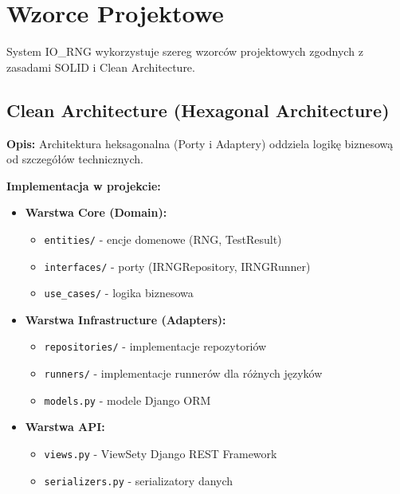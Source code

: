 \documentclass[12pt,a4paper]{article}
\begin{document}
\newpage

\section{Wzorce Projektowe}

System IO\_RNG wykorzystuje szereg wzorców projektowych zgodnych z zasadami SOLID i Clean Architecture.

\subsection{Clean Architecture (Hexagonal Architecture)}

\textbf{Opis:} Architektura heksagonalna (Porty i Adaptery) oddziela logikę biznesową od szczegółów technicznych.

\textbf{Implementacja w projekcie:}

\begin{tcolorbox}[colback=blue!5!white,colframe=blue!75!black,title=Struktura Clean Architecture]
\begin{itemize}
    \item \textbf{Warstwa Core (Domain):}
    \begin{itemize}
        \item \texttt{entities/} - encje domenowe (RNG, TestResult)
        \item \texttt{interfaces/} - porty (IRNGRepository, IRNGRunner)
        \item \texttt{use\_cases/} - logika biznesowa
    \end{itemize}
    
    \item \textbf{Warstwa Infrastructure (Adapters):}
    \begin{itemize}
        \item \texttt{repositories/} - implementacje repozytoriów
        \item \texttt{runners/} - implementacje runnerów dla różnych języków
        \item \texttt{models.py} - modele Django ORM
    \end{itemize}
    
    \item \textbf{Warstwa API:}
    \begin{itemize}
        \item \texttt{views.py} - ViewSety Django REST Framework
        \item \texttt{serializers.py} - serializatory danych
    \end{itemize}
\end{itemize}
\end{tcolorbox}
\end{document}

